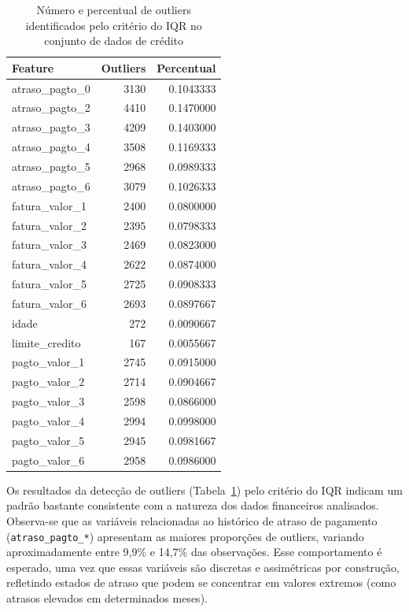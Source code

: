\documentclass[
  brazilian,
  12pt,
  letterpaper,
  DIV=11,
  numbers=noendperiod]{scrartcl}
\begin{document}
{

\begin{longtable}[]{@{}lrr@{}}

\caption{\label{tbl-outliers-default}Número e percentual de outliers
identificados pelo critério do IQR no conjunto de dados de crédito}

\tabularnewline

\toprule\noalign{}
Feature & Outliers & Percentual \\
\midrule\noalign{}
\endhead
\bottomrule\noalign{}
\endlastfoot
atraso\_pagto\_0 & 3130 & 0.1043333 \\
atraso\_pagto\_2 & 4410 & 0.1470000 \\
atraso\_pagto\_3 & 4209 & 0.1403000 \\
atraso\_pagto\_4 & 3508 & 0.1169333 \\
atraso\_pagto\_5 & 2968 & 0.0989333 \\
atraso\_pagto\_6 & 3079 & 0.1026333 \\
fatura\_valor\_1 & 2400 & 0.0800000 \\
fatura\_valor\_2 & 2395 & 0.0798333 \\
fatura\_valor\_3 & 2469 & 0.0823000 \\
fatura\_valor\_4 & 2622 & 0.0874000 \\
fatura\_valor\_5 & 2725 & 0.0908333 \\
fatura\_valor\_6 & 2693 & 0.0897667 \\
idade & 272 & 0.0090667 \\
limite\_credito & 167 & 0.0055667 \\
pagto\_valor\_1 & 2745 & 0.0915000 \\
pagto\_valor\_2 & 2714 & 0.0904667 \\
pagto\_valor\_3 & 2598 & 0.0866000 \\
pagto\_valor\_4 & 2994 & 0.0998000 \\
pagto\_valor\_5 & 2945 & 0.0981667 \\
pagto\_valor\_6 & 2958 & 0.0986000 \\

\end{longtable}

}

Os resultados da detecção de outliers
(Tabela~\ref{tbl-outliers-default}) pelo critério do IQR indicam um
padrão bastante consistente com a natureza dos dados financeiros
analisados. Observa-se que as variáveis relacionadas ao histórico de
atraso de pagamento (\texttt{atraso\_pagto\_*}) apresentam as maiores
proporções de outliers, variando aproximadamente entre 9,9\% e 14,7\%
das observações. Esse comportamento é esperado, uma vez que essas
variáveis são discretas e assimétricas por construção, refletindo
estados de atraso que podem se concentrar em valores extremos (como
atrasos elevados em determinados meses).
\end{document}
